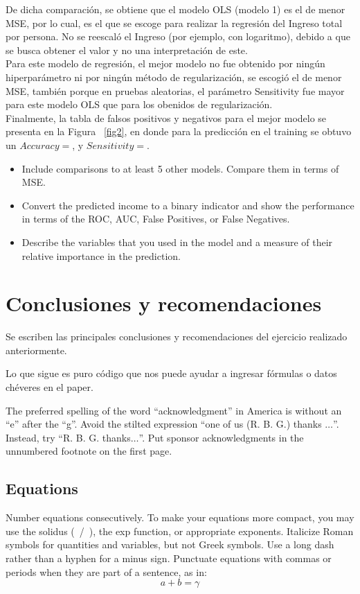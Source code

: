 \documentclass[conference, 10pt]{IEEEtran}
\begin{document}
De dicha comparación, se obtiene que el modelo OLS (modelo 1) es el de menor MSE, por lo cual, es el que se escoge para realizar la regresión del Ingreso total por persona. No se reescaló el Ingreso (por ejemplo, con logaritmo), debido a que se busca obtener el valor y no una interpretación de este.\\
Para este modelo de regresión, el mejor modelo no fue obtenido por ningún hiperparámetro ni por ningún método de regularización, se escogió el de menor MSE, también porque en pruebas aleatorias, el parámetro Sensitivity fue mayor para este modelo OLS que para los obenidos de regularización.\\

Finalmente, la tabla de falsos positivos y negativos para el mejor modelo se presenta en la Figura ~\ref{fig2}, en donde para la predicción en el training se obtuvo un $Accuracy=$, y $Sensitivity=$.


\begin{itemize}
\item Include comparisons to at least 5 other models. Compare them in terms of
MSE.
\item Convert the predicted income to a binary indicator and show the performance in terms of the ROC, AUC, False Positives, or False Negatives.
\item Describe the variables that you used in the model and a measure of their relative importance in the prediction.
\end{itemize}


\section{Conclusiones y recomendaciones}

Se escriben las principales conclusiones y recomendaciones del ejercicio realizado anteriormente.

Lo que sigue es puro código que nos puede ayudar a ingresar fórmulas o datos chéveres en el paper.


The preferred spelling of the word ``acknowledgment'' in America is without 
an ``e'' after the ``g''. Avoid the stilted expression ``one of us (R. B. 
G.) thanks $\ldots$''. Instead, try ``R. B. G. thanks$\ldots$''. Put sponsor 
acknowledgments in the unnumbered footnote on the first page.

\subsection{Equations}
Number equations consecutively. To make your 
equations more compact, you may use the solidus (~/~), the exp function, or 
appropriate exponents. Italicize Roman symbols for quantities and variables, 
but not Greek symbols. Use a long dash rather than a hyphen for a minus 
sign. Punctuate equations with commas or periods when they are part of a 
sentence, as in:
\begin{equation}
a+b=\gamma\label{eq}
\end{equation}
\end{document}

